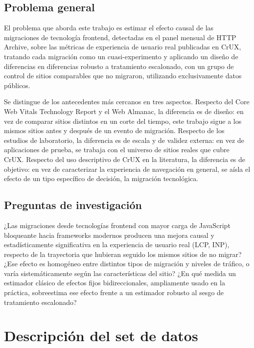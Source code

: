 \documentclass[12pt, a4paper]{article}
\begin{document}
\subsection{Problema general}

El problema que aborda este trabajo es estimar el efecto causal de las migraciones de tecnología frontend, detectadas en el panel mensual de HTTP Archive, sobre las métricas de experiencia de usuario real publicadas en CrUX, tratando cada migración como un cuasi-experimento y aplicando un diseño de diferencias en diferencias robusto a tratamiento escalonado, con un grupo de control de sitios comparables que no migraron, utilizando exclusivamente datos públicos.

Se distingue de los antecedentes más cercanos en tres aspectos. Respecto del Core Web Vitals Technology Report y el Web Almanac, la diferencia es de diseño: en vez de comparar sitios distintos en un corte del tiempo, este trabajo sigue a los mismos sitios antes y después de un evento de migración. Respecto de los estudios de laboratorio, la diferencia es de escala y de validez externa: en vez de aplicaciones de prueba, se trabaja con el universo de sitios reales que cubre CrUX. Respecto del uso descriptivo de CrUX en la literatura, la diferencia es de objetivo: en vez de caracterizar la experiencia de navegación en general, se aísla el efecto de un tipo específico de decisión, la migración tecnológica.

\subsection{Preguntas de investigación}

¿Las migraciones desde tecnologías frontend con mayor carga de JavaScript bloqueante hacia frameworks modernos producen una mejora causal y estadísticamente significativa en la experiencia de usuario real (LCP, INP), respecto de la trayectoria que hubieran seguido los mismos sitios de no migrar? ¿Ese efecto es homogéneo entre distintos tipos de migración y niveles de tráfico, o varía sistemáticamente según las características del sitio? ¿En qué medida un estimador clásico de efectos fijos bidireccionales, ampliamente usado en la práctica, sobreestima ese efecto frente a un estimador robusto al sesgo de tratamiento escalonado?

\section{Descripción del set de datos}
\label{sec:dataset}
\end{document}
